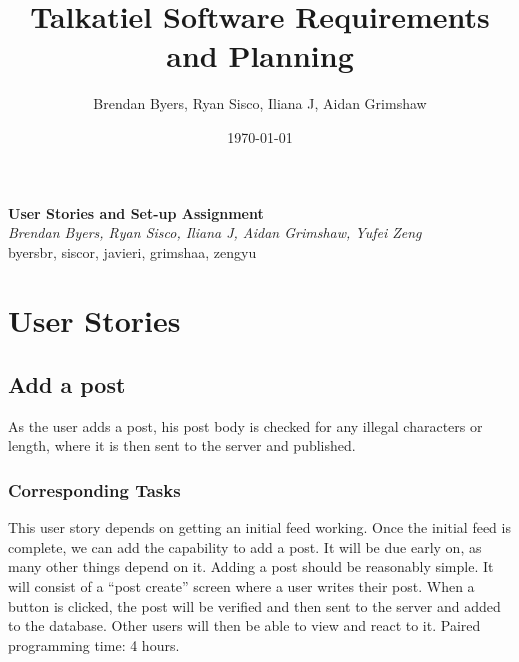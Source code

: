 \documentclass[12pt]{article}
\title{Talkatiel Software Requirements and Planning}
\author{Brendan Byers, Ryan Sisco, Iliana J, Aidan Grimshaw}
\date{\today}
\begin{document}
\begin{center}
      \Large\textbf{User Stories and Set-up Assignment}\\
      \large\textit{Brendan Byers, Ryan Sisco, Iliana J, Aidan Grimshaw, Yufei Zeng}\\
      \large{byersbr, siscor, javieri, grimshaa, zengyu}\\
   \end{center}

\tableofcontents

\section{User Stories}

\subsection{Add a post}
As the user adds a post, his post body is checked for any illegal characters or
length, where it is then sent to the server and published.
\subsubsection{Corresponding Tasks}
This user story depends on getting an initial feed working.  Once the initial feed is complete, we can add the capability to add a post.  It will be due early on, as many other things depend on it.  Adding a post should be reasonably simple.  It will consist of a “post create” screen where a user writes their post.  When a button is clicked, the post will be verified and then sent to the server and added to the database.  Other users will then be able to view and react to it.  Paired programming time: 4 hours.
\end{document}
